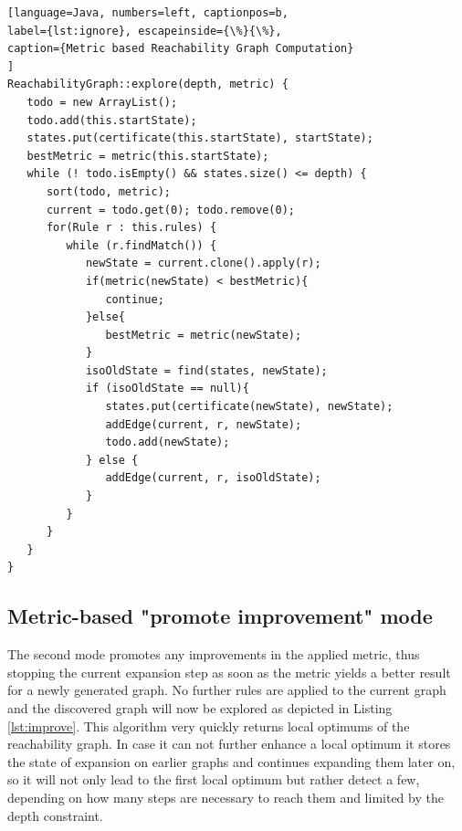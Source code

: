 \documentclass[submission,copyright,creativecommons]{eptcs}
\begin{document}
\begin{lstlisting}[language=Java, numbers=left, captionpos=b, 
label={lst:ignore}, escapeinside={\%}{\%},
caption={Metric based Reachability Graph Computation}
]
ReachabilityGraph::explore(depth, metric) {
   todo = new ArrayList();
   todo.add(this.startState);
   states.put(certificate(this.startState), startState);
   bestMetric = metric(this.startState);
   while (! todo.isEmpty() && states.size() <= depth) {
      sort(todo, metric);
      current = todo.get(0); todo.remove(0);
      for(Rule r : this.rules) {
         while (r.findMatch()) {
            newState = current.clone().apply(r);
            if(metric(newState) < bestMetric){
               continue;
            }else{
               bestMetric = metric(newState);
            }
            isoOldState = find(states, newState);
            if (isoOldState == null){
               states.put(certificate(newState), newState);
               addEdge(current, r, newState);
               todo.add(newState);
            } else {
               addEdge(current, r, isoOldState);
            }
         }
      }
   }
}
\end{lstlisting}


\subsection{Metric-based "promote improvement" mode}

The second mode promotes any improvements in the applied metric, thus stopping 
the current expansion step as soon as the metric yields a better result for a 
newly generated graph. No further rules are applied to the current graph and 
the discovered graph will now be explored as depicted in Listing 
\ref{lst:improve}. This algorithm very quickly returns 
local optimums of the reachability graph. In case it can not further enhance a 
local optimum it stores the state of expansion on earlier graphs and continues 
expanding them later on, so it will not only lead to the first local optimum 
but rather detect a few, depending on how many steps are necessary to reach 
them and limited by the depth constraint.
\end{document}
